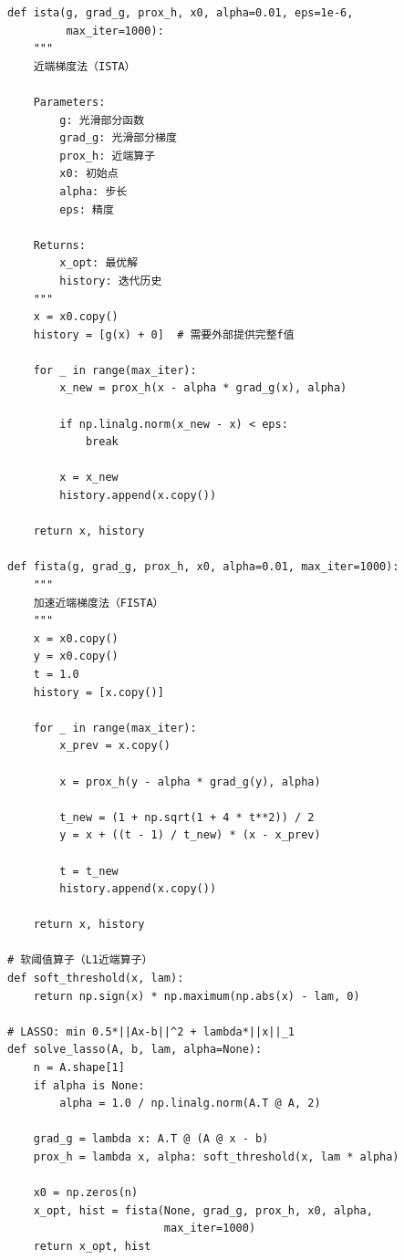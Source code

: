 \begin{codebox}
\begin{lstlisting}
def ista(g, grad_g, prox_h, x0, alpha=0.01, eps=1e-6,
         max_iter=1000):
    """
    近端梯度法（ISTA）
    
    Parameters:
        g: 光滑部分函数
        grad_g: 光滑部分梯度
        prox_h: 近端算子
        x0: 初始点
        alpha: 步长
        eps: 精度
    
    Returns:
        x_opt: 最优解
        history: 迭代历史
    """
    x = x0.copy()
    history = [g(x) + 0]  # 需要外部提供完整f值
    
    for _ in range(max_iter):
        x_new = prox_h(x - alpha * grad_g(x), alpha)
        
        if np.linalg.norm(x_new - x) < eps:
            break
        
        x = x_new
        history.append(x.copy())
    
    return x, history

def fista(g, grad_g, prox_h, x0, alpha=0.01, max_iter=1000):
    """
    加速近端梯度法（FISTA）
    """
    x = x0.copy()
    y = x0.copy()
    t = 1.0
    history = [x.copy()]
    
    for _ in range(max_iter):
        x_prev = x.copy()
        
        x = prox_h(y - alpha * grad_g(y), alpha)
        
        t_new = (1 + np.sqrt(1 + 4 * t**2)) / 2
        y = x + ((t - 1) / t_new) * (x - x_prev)
        
        t = t_new
        history.append(x.copy())
    
    return x, history

# 软阈值算子（L1近端算子）
def soft_threshold(x, lam):
    return np.sign(x) * np.maximum(np.abs(x) - lam, 0)

# LASSO: min 0.5*||Ax-b||^2 + lambda*||x||_1
def solve_lasso(A, b, lam, alpha=None):
    n = A.shape[1]
    if alpha is None:
        alpha = 1.0 / np.linalg.norm(A.T @ A, 2)
    
    grad_g = lambda x: A.T @ (A @ x - b)
    prox_h = lambda x, alpha: soft_threshold(x, lam * alpha)
    
    x0 = np.zeros(n)
    x_opt, hist = fista(None, grad_g, prox_h, x0, alpha,
                        max_iter=1000)
    return x_opt, hist
\end{lstlisting}
\end{codebox}


